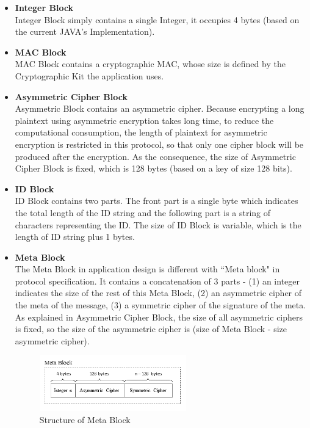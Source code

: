 \begin{itemize}
\item \textbf{Integer Block} \\
Integer Block simply contains a single Integer, it occupies 4 bytes (based on the current JAVA's Implementation).

\item \textbf{MAC Block} \\
MAC Block contains a cryptographic MAC, whose size is defined by the Cryptographic Kit the application uses.

\item \textbf{Asymmetric Cipher Block} \\
Asymmetric Block contains an asymmetric cipher. Because encrypting a long plaintext using asymmetric encryption takes long time, to reduce the computational consumption, the length of plaintext for asymmetric encryption is restricted in this protocol, so that only one cipher block will be produced after the encryption. As the consequence, the size of Asymmetric Cipher Block is fixed, which is 128 bytes (based on a key of size 128 bits).

\item \textbf{ID Block} \\
ID Block contains two parts. The front part is a single byte which indicates the total length of the ID string and the following part is a string of characters representing the ID. The size of ID Block is variable, which is the length of ID string plus 1 bytes.

\item \textbf{Meta Block} \\
The Meta Block in application design is different with ``Meta block" in protocol specification. It contains a concatenation of 3 parts - (1) an integer indicates the size of the rest of this Meta Block, (2) an asymmetric cipher of the meta of the message, (3) a symmetric cipher of the signature of the meta. As explained in Asymmetric Cipher Block, the size of all asymmetric ciphers is fixed, so the size of the asymmetric cipher is (size of Meta Block - size asymmetric cipher).

\begin{figure}[h!]
\centering
\includegraphics[width=0.6\textwidth,natwidth=459,natheight=174]{figures/metablock.png}
\caption{Structure of Meta Block}
\end{figure}


\end{itemize}
